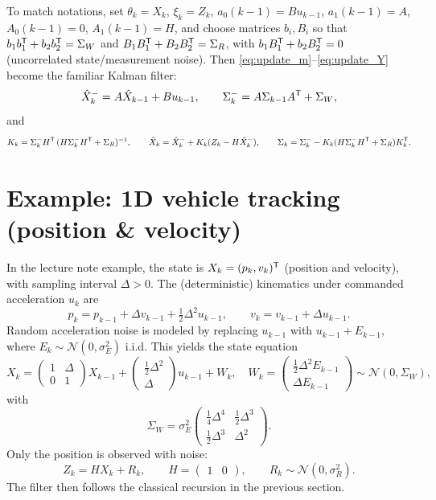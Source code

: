 To match notations, set \(\theta_k=X_k\), \(\xi_k=Z_k\),
\(a_0(k-1)=B u_{k-1}\), \(a_1(k-1)=A\), \(A_0(k-1)=0\), \(A_1(k-1)=H\),
and choose matrices \(b_i,B_i\) so that
\(
b_1b_1^{\mathsf{T}}+b_2b_2^{\mathsf{T}}=\Sigma_W
\)
and
\(
B_1B_1^{\mathsf{T}}+B_2B_2^{\mathsf{T}}=\Sigma_R
\),
with \(b_1B_1^{\mathsf{T}}+b_2B_2^{\mathsf{T}}=0\) (uncorrelated state/measurement noise).
Then \eqref{eq:update_m}--\eqref{eq:update_Y} become the familiar Kalman filter:
\[
\hat X_k^- = A\hat X_{k-1}+B u_{k-1},\qquad
\Sigma_k^- = A\Sigma_{k-1}A^{\mathsf{T}}+\Sigma_W,
\]
and
\[
K_k = \Sigma_k^- H^{\mathsf{T}}\,(H\Sigma_k^-H^{\mathsf{T}}+\Sigma_R)^{-1},
\qquad
\hat X_k = \hat X_k^- + K_k(Z_k-H\hat X_k^-),
\qquad
\Sigma_k = \Sigma_k^- - K_k(H\Sigma_k^-H^{\mathsf{T}}+\Sigma_R)K_k^{\mathsf{T}}.
\]

\section{Example: 1D vehicle tracking (position \& velocity)}

In the lecture note example, the state is
\(
X_k=(p_k,v_k)^{\mathsf{T}}
\)
(position and velocity), with sampling interval \(\Delta>0\).
The (deterministic) kinematics under commanded acceleration \(u_k\) are
\[
p_k = p_{k-1}+\Delta v_{k-1}+\tfrac12 \Delta^2 u_{k-1},\qquad
v_k = v_{k-1}+\Delta u_{k-1}.
\]
Random acceleration noise is modeled by replacing \(u_{k-1}\) with \(u_{k-1}+E_{k-1}\),
where \(E_k\sim \mathcal{N}(0,\sigma_E^2)\) i.i.d.
This yields the state equation
\[
X_k =
\begin{pmatrix}
1 & \Delta\\
0 & 1
\end{pmatrix}
X_{k-1}+
\begin{pmatrix}
\tfrac12\Delta^2\\
\Delta
\end{pmatrix}
u_{k-1}
+W_k,
\quad
W_k=
\begin{pmatrix}
\tfrac12\Delta^2 E_{k-1}\\
\Delta E_{k-1}
\end{pmatrix}
\sim \mathcal{N}(0,\Sigma_W),
\]
with
\[
\Sigma_W=\sigma_E^2
\begin{pmatrix}
\tfrac14\Delta^4 & \tfrac12\Delta^3\\
\tfrac12\Delta^3 & \Delta^2
\end{pmatrix}.
\]
Only the position is observed with noise:
\[
Z_k = H X_k + R_k,\qquad H=\begin{pmatrix}1&0\end{pmatrix},
\qquad R_k\sim \mathcal{N}(0,\sigma_R^2).
\]
The filter then follows the classical recursion in the previous section.

